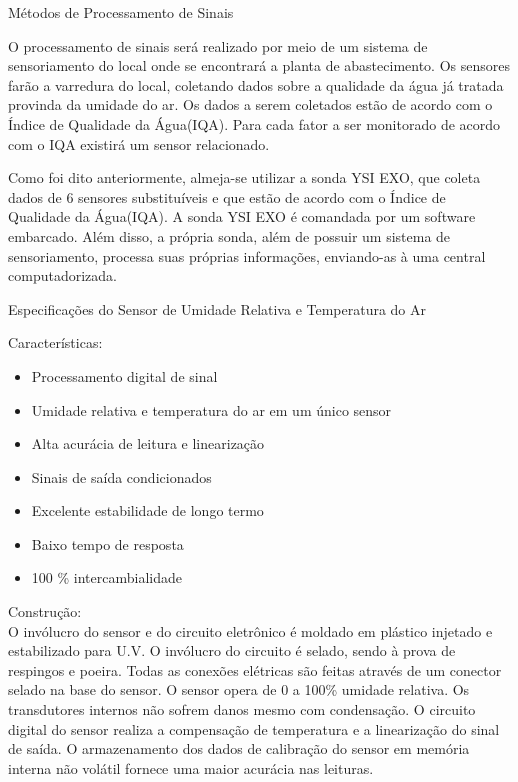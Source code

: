\documentclass[12pt,openright,oneside,a4paper,brazil]{abntex2}
\begin{document}
\begin{center}
 {\large Métodos de Processamento de Sinais}\\
 \end{center}
 O processamento de sinais será realizado por meio de um sistema de sensoriamento do local onde se encontrará a planta de abastecimento. Os sensores farão a varredura do local, coletando dados sobre a qualidade da água já tratada provinda da umidade do ar. Os dados a serem coletados estão de acordo com o Índice de Qualidade da Água(IQA). Para cada fator a ser monitorado de acordo com o IQA existirá um sensor relacionado. 
 
	Como foi dito anteriormente, almeja-se utilizar a sonda YSI EXO, que coleta dados de 6 sensores substituíveis e que estão de acordo com o Índice de Qualidade da Água(IQA). A sonda YSI EXO é comandada por um software embarcado. Além disso, a própria sonda, além de possuir um sistema de sensoriamento, processa suas próprias informações, enviando-as à uma central computadorizada.
\newpage
\begin{center}
 {\large Especificações do Sensor de Umidade Relativa e Temperatura do Ar}\\
 \end{center}
{\large Características:}\\
 \begin{itemize}
\item Processamento digital de sinal
\item Umidade relativa e temperatura do ar em um único sensor
\item Alta acurácia de leitura e linearização
\item Sinais de saída condicionados
\item Excelente estabilidade de longo termo
\item Baixo tempo de resposta
\item 100 \% intercambialidade
 \end{itemize}
{\large Construção:}\\
O invólucro do sensor e do circuito eletrônico é moldado em plástico injetado e estabilizado para U.V. O invólucro do circuito é selado, sendo à prova de respingos e poeira. Todas as conexões elétricas são feitas através de um conector selado na base do sensor. O sensor opera de 0 a 100\% umidade relativa. Os transdutores internos não sofrem danos mesmo com condensação. O circuito digital do sensor realiza a compensação de temperatura e a linearização do sinal de saída. O armazenamento dos dados de calibração do sensor em memória interna não volátil fornece uma maior acurácia nas leituras.
\end{document}
